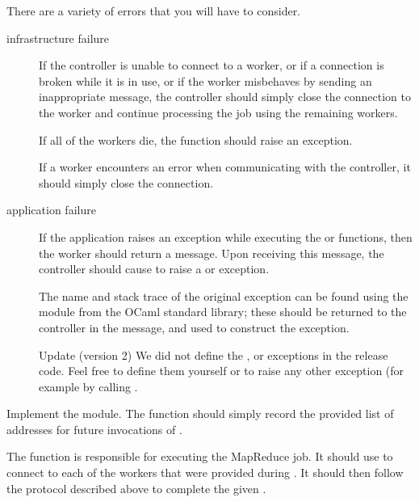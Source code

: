 \documentclass{pset}
\begin{document}
There are a variety of errors that you will have to consider.
\begin{description}
\item[infrastructure failure]
If the controller is unable to connect to a worker, or if a connection is broken
while it is in use, or if the worker misbehaves by sending an inappropriate
message, the controller should simply close the connection to the worker and
continue processing the job using the remaining workers.

If all of the workers die, the  function should raise an
 exception.

If a worker encounters an error when communicating with the controller, it
should simply close the connection.

\item[application failure]
If the application raises an exception while executing the  or
 functions, then the worker should return a 
message.  Upon receiving this message, the controller should cause
 to raise a  or  exception.

The name and stack trace of the original exception can be found using the
 module from the OCaml standard library; these should be returned
to the controller in the  message, and used to construct the
 exception.

\begin{note}{Update (version 2)}
\label{update:exceptions}
We did not define the ,  or
 exceptions in the release code.  Feel free to define them
yourself or to raise any other exception (for example by calling
.
\end{note}

\end{description}


Implement the  module.  The  function should
simply record the provided list of addresses for future invocations of
.

The  function is responsible for executing the MapReduce
job.  It should use  to connect to each of the workers that
were provided during .  It should then follow the protocol described
above to complete the given .
\end{document}
